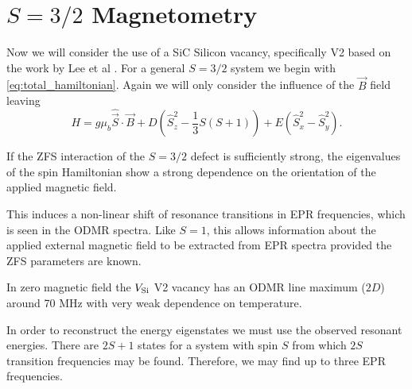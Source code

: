 \section{$S = 3/2$ Magnetometry}\label{sec:1.5magnet}
Now we will consider the use of a SiC Silicon vacancy, specifically V2 based on the work by Lee et al
\cite{PhysRevB.92.115201}.
For a general $S=3/2$ system we begin with \eqref{eq:total_hamiltonian}.
Again we will only consider the influence of the $\vec{B}$ field leaving
\begin{equation}
	H = g\mu_b \hat{\vec{S}}\cdot\vec{B} + D\left(\hat{S}_z^2 - \frac{1}{3}S(S+1)\right) + E(\hat{S}_x^2 - \hat{S}_y^2).
	\label{eq:s1.5_magnetometry_hamiltonian}
\end{equation}

If the ZFS interaction of the $S=3/2$ defect is sufficiently strong, the eigenvalues of the
spin Hamiltonian show a strong dependence on the orientation of the applied magnetic field.

This induces a non-linear shift of resonance transitions in EPR frequencies, which is seen in the ODMR spectra. Like $S=1$, this allows information about the applied external magnetic field to be extracted from EPR spectra provided the ZFS parameters are known.

In zero magnetic field the $V_{\ce{Si}}$ V2 vacancy has an ODMR line maximum ($2D$) around 70 MHz with very weak dependence on temperature.


In order to
reconstruct the energy eigenstates we must use the observed resonant energies. There are $2S +1 $ states for a system with spin $S$ from which $2S$ transition frequencies may be found. Therefore, we may find up to three EPR frequencies.



%

